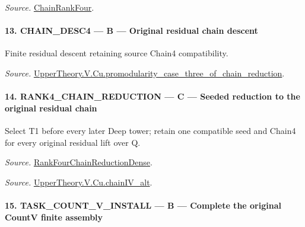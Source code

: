 \documentclass[11pt,a4paper]{article}
\numberwithin{equation}{section}
\theoremstyle{remark}\newtheorem{remark}[theorem]{Remark}
\begin{document}
\emph{Source.} \href{https://github.com/CocoSgt/riemann-hypothesis-lean/blob/7cbf7a0c32fca1badf05931879a37c3f8a2b03b4/src/Development/AutomorphicArithmetic/AutomorphicVarieties/ModularityArgument/ThresholdArguments/DenseThresholdCases/PromodularityCaseThree.lean#L26-L32}{ChainRankFour}.



\paragraph{13. CHAIN\_\allowbreak DESC4 — B — Original residual chain descent}

Finite residual descent retaining source Chain4 compatibility.

\emph{Source.} \href{https://github.com/CocoSgt/riemann-hypothesis-lean/blob/7cbf7a0c32fca1badf05931879a37c3f8a2b03b4/src/Development/AutomorphicArithmetic/AutomorphicVarieties/ModularityArgument/ThresholdArguments/DenseThresholdCases/PromodularityCaseThreeOfLemmas.lean#L131-L153}{UpperTheory.V.Cu.promodularity\_\allowbreak case\_\allowbreak three\_\allowbreak of\_\allowbreak chain\_\allowbreak reduction}.



\paragraph{14. RANK4\_\allowbreak CHAIN\_\allowbreak REDUCTION — C — Seeded reduction to the original residual chain}

Select T1 before every later Deep tower; retain one compatible seed and Chain4 for every original residual lift over Q.

\emph{Source.} \href{https://github.com/CocoSgt/riemann-hypothesis-lean/blob/7cbf7a0c32fca1badf05931879a37c3f8a2b03b4/src/Development/AutomorphicArithmetic/AutomorphicVarieties/ModularityArgument/ThresholdArguments/DenseThresholdCases/PromodularityCaseThree.lean#L33-L39}{RankFourChainReductionDense}.

\emph{Source.} \href{https://github.com/CocoSgt/riemann-hypothesis-lean/blob/7cbf7a0c32fca1badf05931879a37c3f8a2b03b4/src/Development/AutomorphicArithmetic/AutomorphicVarieties/ModularityArgument/ThresholdArguments/DenseThresholdCases/CuPChainIV.lean#L16-L82}{UpperTheory.V.Cu.chainIV\_\allowbreak alt}.



\paragraph{15. TASK\_\allowbreak COUNT\_\allowbreak V\_\allowbreak INSTALL — B — Complete the original CountV finite assembly}
\end{document}
